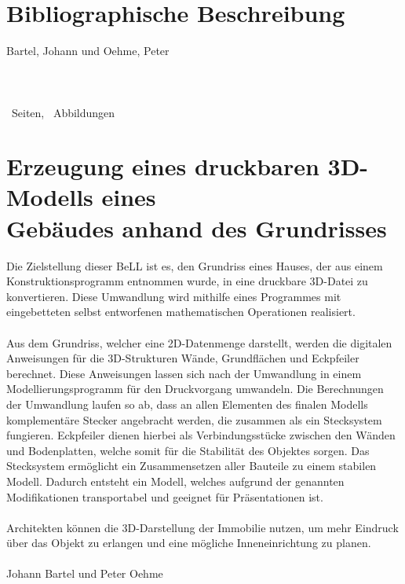 \chapter*{Bibliographische Beschreibung}
Bartel, Johann und Oehme, Peter\\\\
\q{\docTitle}\\\\
  \theseitennr\ Seiten, \totalfigures\ Abbildungen
 
  \newpage
 
\chapter*{Erzeugung eines druckbaren 3D-Modells eines \\ Gebäudes anhand des Grundrisses}
Die Zielstellung dieser BeLL ist es, den Grundriss eines Hauses, der aus einem Konstruktionsprogramm entnommen wurde, in eine druckbare 3D-Datei zu konvertieren.
Diese Umwandlung wird mithilfe eines Programmes mit eingebetteten selbst entworfenen mathematischen Operationen realisiert.\\\\
Aus dem Grundriss, welcher eine 2D-Datenmenge darstellt, werden die digitalen Anweisungen für die 3D-Strukturen Wände, Grundflächen und \mbox{Eckpfeiler} berechnet. 
Diese Anweisungen lassen sich nach der Umwandlung in einem Modellierungsprogramm für den Druckvorgang umwandeln.
Die Berechnungen der Umwandlung laufen so ab, dass an allen Elementen des finalen Modells komplementäre Stecker angebracht werden, die zusammen als ein Stecksystem fungieren. 
Eckpfeiler dienen hierbei als Verbindungsstücke zwischen den Wänden und Bodenplatten, welche somit für die Stabilität des Objektes  sorgen. 
Das Stecksystem ermöglicht ein Zusammensetzen aller Bauteile zu einem stabilen Modell. 
Dadurch entsteht ein Modell, welches aufgrund der genannten Modifikationen transportabel und geeignet für Präsentationen ist.\\\\
Architekten können die 3D-Darstellung der Immobilie  nutzen, um mehr Eindruck über das Objekt zu erlangen und eine mögliche Inneneinrichtung zu planen.\\\\
Johann Bartel und Peter Oehme
